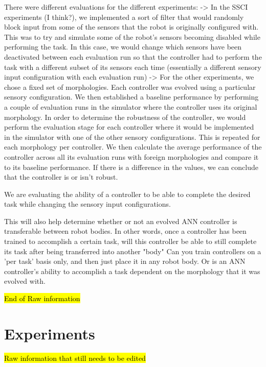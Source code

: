 \documentclass[conference]{IEEEtran}
\begin{document}
There were different evaluations for the different experiments:
-> In the SSCI experiments (I think?), we implemented a sort of filter that would randomly block input from some of the sensors that the robot is originally configured with. This was to try and simulate some of the robot's sensors becoming disabled while performing the task. In this case, we would change which sensors have been deactivated between each evaluation run so that the controller had to perform the task with a different subset of its sensors each time (essentially a different sensory input configuration with each evaluation run)
-> For the other experiments, we chose a fixed set of morphologies. Each controller was evolved using a particular sensory configuration. We then established a baseline performance by performing a couple of evaluation runs in the simulator where the controller uses its original morphology. In order to determine the robustness of the controller, we would perform the evaluation stage for each controller where it would be implemented in the simulator with one of the other sensory configurations. This is repeated for each morphology per controller. We then calculate the average performance of the controller across all its evaluation runs with foreign morphologies and compare it to its baseline performance. If there is a difference in the values, we can conclude that the controller is or isn't robust. 

We are evaluating the ability of a controller to be able to complete the desired task while changing the sensory input configurations. 

This will also help determine whether or not an evolved ANN controller is transferable between robot bodies. In other words, once a controller has been trained to accomplish a certain task, will this controller be able to still complete its task after being transferred into another "body"
Can you train controllers on a 'per task' basis only, and then just place it in any robot body. Or is an ANN controller's ability to accomplish a task dependent on the morphology that it was evolved with.
	
\hl{End of Raw information}
	
\section{Experiments}\label{sec:experiments}

\hl{Raw information that still needs to be edited}
\end{document}
